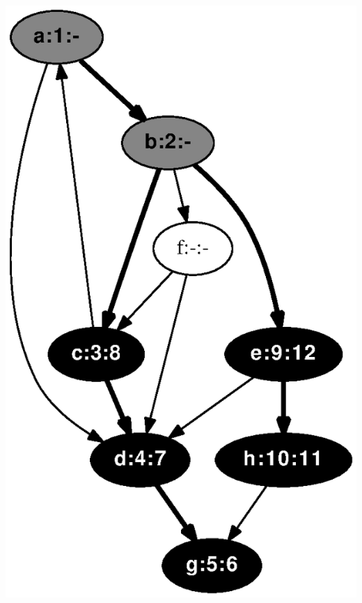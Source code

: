 \documentclass{article}
\begin{document}
\includegraphics[height=.3\textheight]{dfs_directed_classroom_12.eps}
\vspace{1em}
\end{document}
